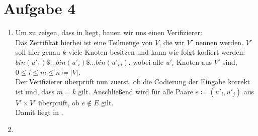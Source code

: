 \documentclass[a4paper,11pt]{scrartcl}
\begin{document}
	\section*{Aufgabe 4}
	\begin{enumerate}[label=\alph*)]
	\item	Um zu zeigen, dass  in \NP liegt, bauen wir uns einen Verifizierer:\\
		Das Zertifikat hierbei ist eine Teilmenge von $V$, die wir $V'$ nennen werden. $V'$ soll hier genau $k$-viele Knoten besitzen und kann wie folgt kodiert werden:\\
		$bin(u'_1)\$...bin(u'_i)\$...bin(u'_m)$, wobei alle $u'_i$ Knoten aus $V'$ sind, $0\leq i \leq m \leq n \coloneqq \vert V \vert$.\\
		Der Verifizierer überprüft nun zuerst, ob die Codierung der Eingabe korrekt ist und, dass $m = k$ gilt. Anschließend wird für alle Paare $e \coloneqq (u'_i, u'_j)$ aus $V' \times V'$ überprüft, ob $e \not\in E$ gilt.\\
	Damit liegt  in \NP.
	
	\item
	\end{enumerate}
	
\end{document}
